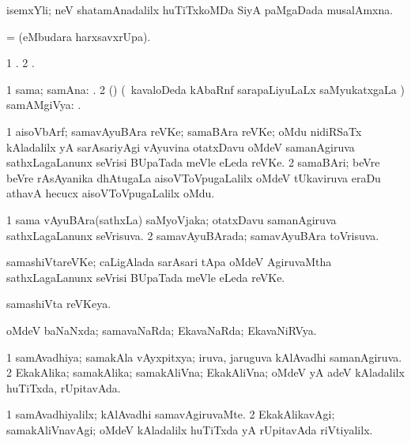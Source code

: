 \bentry
{}
\gl{\nA}
\bmng
isemxYli; neV shatamAnadalilx huTiTxkoMDa SiyA paMgaDada musalAmxna. 
\emng
\eentry

\bentry
{}
\gl{\kirx}
\bmng
=  (eMbudara harxsavxrUpa). 
\emng
\eentry

\bentry
{}
\gl{\saMkiSx}
\bmng
\bnum
\num{1} . 
\num{2} . 
\enum
\emng
\eentry

\bentry
{}
\gl{\sapUpa}
\bmng
\bnum
\num{1} sama; samAna: . 
\num{2} (\ravi) (\kanmu\ kavaloDeda kAbaRnf sarapaLiyuLaLx saMyukatxgaLa \vi) samAMgiVya: . 
\enum
\emng
\eentry

\bentry
{}
\gl{\nA}
\bmng
\bnum
\num{1} aisoVbArf; samavAyuBAra reVKe; samaBAra reVKe; oMdu nidiRSaTx kAladalilx yA sarAsariyAgi vAyuvina otatxDavu oMdeV samanAgiruva sathxLagaLanunx seVrisi BUpaTada meVle eLeda reVKe. 
\num{2} samaBAri; beVre beVre rAsAyanika dhAtugaLa aisoVToVpugaLalilx oMdeV tUkaviruva eraDu athavA hecucx aisoVToVpugaLalilx oMdu. 
\enum
\emng
\eentry

\bentry
{}
\gl{\gu}
\bmng
\bnum
\num{1} sama vAyuBAra(sathxLa) saMyoVjaka; otatxDavu samanAgiruva sathxLagaLanunx seVrisuva. 
\num{2} samavAyuBArada; samavAyuBAra toVrisuva. 
\enum
\emng
\eentry

\bentry
{}
\gl{\nA}
\bmng
samashiVtareVKe; caLigAlada sarAsari tApa oMdeV AgiruvaMtha sathxLagaLanunx seVrisi BUpaTada meVle eLeda reVKe. 
\emng
\eentry

\bentry
{}
\gl{\gu}
\bmng
samashiVta reVKeya. 
\emng
\eentry

\bentry
{}
\gl{\gu}
\bmng
oMdeV baNaNxda; samavaNaRda; EkavaNaRda; EkavaNiRVya. 
\emng
\eentry

\bentry
{}
\gl{\gu}
\bmng
\bnum
\num{1} samAvadhiya; samakAla vAyxpitxya; iruva, jaruguva kAlAvadhi samanAgiruva. 
\num{2} EkakAlika; samakAlika; samakAliVna; EkakAliVna; oMdeV yA adeV kAladalilx huTiTxda, rUpitavAda. 
\enum
\emng
\eentry

\bentry
{}
\gl{\kirxvi}
\bmng
\bnum
\num{1} samAvadhiyalilx; kAlAvadhi samavAgiruvaMte. 
\num{2} EkakAlikavAgi; samakAliVnavAgi; oMdeV kAladalilx huTiTxda yA rUpitavAda riVtiyalilx. 
\enum
\emng
\eentry

